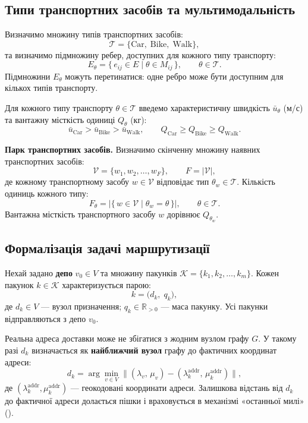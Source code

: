 \documentclass[14pt,a4paper]{extarticle}
\theoremstyle{definition}
\theoremstyle{plain}
\newcommand{\Real}{\mathbb{R}}
\begin{document}
\subsection{Типи транспортних засобів та мультимодальність}

Визначимо множину типів транспортних засобів:
\[
    \mathcal{T} = \{\mathrm{Car},\; \mathrm{Bike},\; \mathrm{Walk}\},
\]
та визначимо підмножину ребер, доступних для кожного типу транспорту:
\[
    E_\theta = \bigl\{\, e_{ij} \in E \mid \theta \in M_{ij} \,\bigr\}, \qquad \theta \in \mathcal{T}.
\]
Підмножини $E_\theta$ можуть перетинатися: одне ребро може бути доступним для кількох типів транспорту.

Для кожного типу транспорту $\theta \in \mathcal{T}$ введемо характеристичну швидкість $\bar{u}_\theta$ (м/с) та вантажну місткість одиниці $Q_\theta$ (кг):
\[
    \bar{u}_{\mathrm{Car}} > \bar{u}_{\mathrm{Bike}} > \bar{u}_{\mathrm{Walk}}, \qquad
    Q_{\mathrm{Car}} \geq Q_{\mathrm{Bike}} \geq Q_{\mathrm{Walk}}.
\]

\textbf{Парк транспортних засобів.} Визначимо скінченну множину наявних транспортних засобів:
\[
    \mathcal{V} = \{w_1, w_2, \ldots, w_F\}, \qquad F = |\mathcal{V}|,
\]
де кожному транспортному засобу $w \in \mathcal{V}$ відповідає тип $\theta_w \in \mathcal{T}$. Кількість одиниць кожного типу:
\[
    F_\theta = \bigl|\{\, w \in \mathcal{V} \mid \theta_w = \theta \,\}\bigr|, \qquad \theta \in \mathcal{T}.
\]
Вантажна місткість транспортного засобу $w$ дорівнює $Q_{\theta_w}$.

\subsection{Формалізація задачі маршрутизації}

Нехай задано \textbf{депо} $v_0 \in V$ та множину пакунків $\mathcal{K} = \{k_1, k_2, \ldots, k_m\}$. Кожен пакунок $k \in \mathcal{K}$ характеризується парою:
\[
    k = \bigl(d_k,\; q_k\bigr),
\]
де $d_k \in V$ --- вузол призначення; $q_k \in \Real_{>0}$ --- маса пакунку. Усі пакунки відправляються з депо $v_0$.

Реальна адреса доставки може не збігатися з жодним вузлом графу $G$. У такому разі $d_k$ визначається як \textbf{найближчий вузол} графу до фактичних координат адреси:
\[
    d_k = \arg\min_{v \in V} \bigl\| (\lambda_v,\, \mu_v) - (\lambda_k^{\mathrm{addr}},\, \mu_k^{\mathrm{addr}}) \bigr\|,
\]
де $(\lambda_k^{\mathrm{addr}}, \mu_k^{\mathrm{addr}})$ --- геокодовані координати адреси. Залишкова відстань від $d_k$ до фактичної адреси долається пішки і враховується в механізмі «останньої милі» (\cite{wang2014}).
\end{document}
